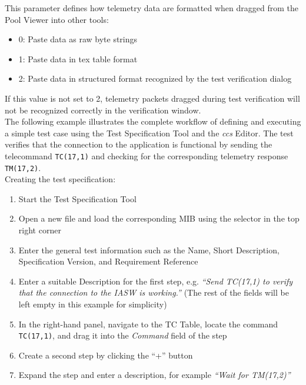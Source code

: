 This parameter defines how telemetry data are formatted when dragged from the Pool Viewer into other tools:
\begin{itemize}
    \item 0: Paste data as raw byte strings
    \item 1: Paste data in tex table format
    \item 2: Paste data in structured format recognized by the test verification dialog
\end{itemize}
If this value is not set to 2, telemetry packets dragged during test verification will not be recognized correctly in the verification window.\\

The following example illustrates the complete workflow of defining and executing a simple test case using the Test Specification Tool and the \textit{ccs} Editor. 
The test verifies that the connection to the application is functional by sending the telecommand \texttt{TC(17,1)} and checking for the corresponding telemetry response \texttt{TM(17,2)}. \\

Creating the test specification:
\begin{enumerate}
    \item Start the Test Specification Tool
    
    \item Open a new file and load the corresponding MIB using the selector in the top right corner
    
    \item Enter the general test information such as the Name, Short Description, Specification Version, and Requirement Reference
    
    \item Enter a suitable Description for the first step, e.g.
    \emph{“Send TC(17,1) to verify that the connection to the IASW is working.”} (The rest of the fields will be left empty in this example for simplicity)
    
    \item In the right-hand panel, navigate to the TC Table, locate the command \texttt{TC(17,1)}, and drag it into the \emph{Command} field of the step
    
    \item Create a second step by clicking the “+” button
    
    \item Expand the step and enter a description, for example
    \emph{“Wait for TM(17,2)”}
\end{enumerate}


